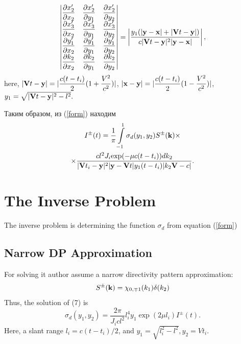 \documentclass{procDDs}
\begin{document}
\begin{equation*}
\begin{vmatrix}
	\dfrac{\partial x'_2}{\partial x_2} & \dfrac{\partial x'_2}{\partial y_1} & \dfrac{\partial x'_2}{\partial y_2}\\
	\dfrac{\partial x'_3}{\partial x_2} & \dfrac{\partial x'_3}{\partial y_1} & \dfrac{\partial x'_3}{\partial y_2}\\
	\dfrac{\partial y'_1}{\partial x_2} & \dfrac{\partial y'_1}{\partial y_1} & \dfrac{\partial y'_1}{\partial y_2}\\
	\dfrac{\partial k_2}{\partial x_2} & \dfrac{\partial k_2}{\partial y_1} & \dfrac{\partial k_2}{\partial y_2}
\end{vmatrix} = \left| \frac{y_1(|\mathbf{y}-\mathbf{x}|+|\mathbf{V}t-\mathbf{y}|)}{c|\mathbf{V}t-\mathbf{y}|^2|\mathbf{y}-\mathbf{x}|} \right|,	 
\end{equation*}
here, $|\mathbf{V}t - \mathbf{y}| = |\dfrac{c(t-t_i)}{2}(1+\dfrac{V^2}{c^2})|$, $|\mathbf{x}-\mathbf{y}| = |\dfrac{c(t-t_i)}{2}(1-\dfrac{V^2}{c^2})|$, $y_1 = \sqrt{|\mathbf{V}t-\mathbf{y}|^2 - l^2}.$

Таким образом, из (\ref{form}) находим
\begin{multline}
	I^\pm(t) = \frac{1}{\pi}\int\limits_{-1}^{1}\sigma_d(y_1,y_2) S^{\pm}(\mathbf{k}) \times \\ \times
	\frac{ cl^2J_i \text{exp}(-\mu c(t-t_i))dk_2}{|\mathbf{V}t_i-\mathbf{y}|^2|\mathbf{y}-\mathbf{V}t|y_1(t-t_i)|k_2 \mathbf{V}-c|}.
\end{multline}

\section{The Inverse Problem}
The inverse problem is determining the function $\sigma_d$ from equation (\ref{form})
\subsection{Narrow DP Approximation}
 For solving it author assume a narrow directivity pattern approximation:
\begin{equation}
S^{\pm}(\mathbf{k}) = \chi_{0,\mp1}(k_1)\delta(k_2)
\end{equation}
Thus, the solution of (7) is
\begin{equation}
	\label{sigma_form}
	\sigma_d \left( y_1, y_2 \right) = \frac{2\pi}{J_icl^2} l_i^4 y_1 \exp(2\mu l_i)I^\pm(t).
\end{equation}
Here, a slant range $l_i=c(t-t_i)/2$, and $y_1=\sqrt{l_i^2-l^2}, y_2=Vt_i$.
\end{document}
